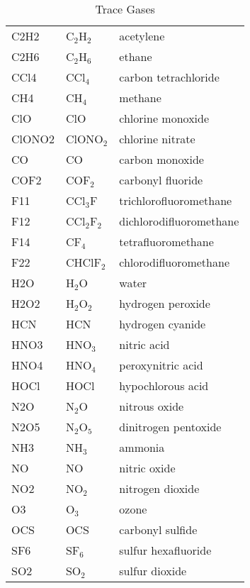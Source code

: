 \begin{table*}[h!]
\caption{Trace Gases}
\begin{tabular}{|l|l|l|}
\hline
\cellcolor[RGB]{188,188,188}{Emitter Name} & \cellcolor[RGB]{188,188,188}{Formula} &
\cellcolor[RGB]{188,188,188}{Name} \\
\hline
\hline
C2H2 & C$_2$H$_2$  & acetylene \\
C2H6 & C$_2$H$_6$  & ethane \\
CCl4 & CCl$_4$     & carbon tetrachloride \\
CH4  & CH$_4$      & methane \\
ClO  & ClO         & chlorine monoxide \\
ClONO2 & ClONO$_2$ & chlorine nitrate \\
CO   & CO          & carbon monoxide  \\
COF2 & COF$_2$     & carbonyl fluoride \\
F11  & CCl$_3$F    & trichlorofluoromethane  \\
F12  & CCl$_2$F$_2$ & dichlorodifluoromethane \\
F14  & CF$_4$      & tetrafluoromethane \\
F22  & CHClF$_2$   & chlorodifluoromethane  \\
H2O  & H$_2$O      & water \\
H2O2 & H$_2$O$_2$  & hydrogen peroxide  \\
HCN  & HCN         & hydrogen cyanide \\
HNO3 & HNO$_3$     & nitric acid \\
HNO4 & HNO$_4$     & peroxynitric acid  \\
HOCl & HOCl        & hypochlorous acid \\
N2O  & N$_2$O      & nitrous oxide \\
N2O5 & N$_2$O$_5$  & dinitrogen pentoxide \\
NH3  & NH$_3$      & ammonia \\
NO   & NO          & nitric oxide \\
NO2  & NO$_2$      & nitrogen dioxide \\
O3   & O$_3$       & ozone  \\
OCS  & OCS         & carbonyl sulfide \\
SF6  & SF$_6$      & sulfur hexafluoride \\
SO2  & SO$_2$      & sulfur dioxide  \\
\hline
\end{tabular}
\label{tab:Emitter}
\end{table*} 

